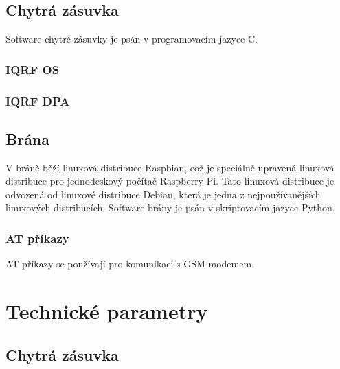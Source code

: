 \documentclass[12pt,a4paper,oneside]{article}
\begin{document}
\subsection{Chytrá zásuvka}

Software chytré zásuvky je psán v programovacím jazyce C. 

\subsubsection{IQRF OS}

\subsubsection{IQRF DPA}

\subsection{Brána}

V bráně běží linuxová distribuce Raspbian, což je speciálně upravená linuxová distribuce pro jednodeskový počítač Raspberry Pi. Tato linuxová distribuce je odvozená od linuxové distribuce Debian, která je jedna z nejpoužívanějších linuxových distribucích. Software brány je psán v skriptovacím jazyce Python.

\subsubsection{AT příkazy}

AT příkazy se používají pro komunikaci s GSM modemem. 

\newpage

\section{Technické parametry}

\subsection{Chytrá zásuvka}
\end{document}

